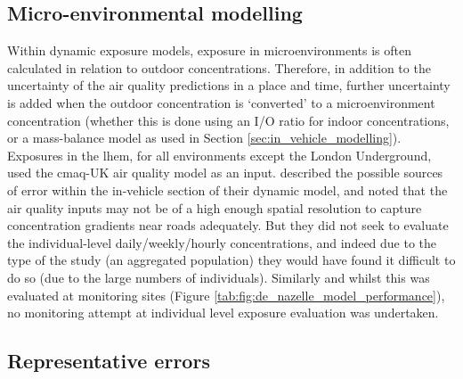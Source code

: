 \subsection{Micro-environmental modelling}
\label{microenvironmental_modelling}

Within dynamic exposure models, exposure in microenvironments is often calculated in relation to outdoor concentrations. Therefore, in addition to the uncertainty of the air quality predictions in a place and time, further uncertainty is added when the outdoor concentration is ‘converted’ to a microenvironment concentration (whether this is done using an I/O ratio for indoor concentrations, or a mass-balance model as used in Section \ref{sec:in_vehicle_modelling}). Exposures in the \gls{lhem}, for all environments except the London Underground, used the \gls{cmaq}-UK air quality model as an input. \cite{Dhondt2012} described the possible sources of error within the in-vehicle section of their dynamic model, and noted that the air quality inputs may not be of a high enough spatial resolution to capture concentration gradients near roads adequately. But they did not seek to evaluate the individual-level daily/weekly/hourly concentrations, and indeed due to the type of the study (an aggregated population) they would have found it difficult to do so (due to the large numbers of individuals). Similarly and whilst this was evaluated at monitoring sites (Figure \ref{tab:fig:de_nazelle_model_performance}), no monitoring attempt at individual level exposure evaluation was undertaken.

\subsection{Representative errors}
\label{representative_errors}


